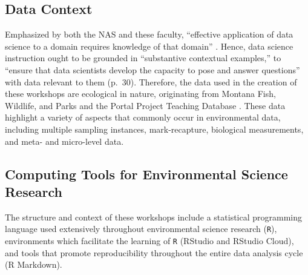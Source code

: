 \documentclass[12pt]{article}
\begin{document}
% 

\subsection{Data Context}  

\quad Emphasized by both the NAS and these faculty, ``effective application of
data science to a domain requires knowledge of that domain'' \citep[p.\ 29]{nas}. 
Hence, data science instruction ought to be grounded in ``substantive contextual
examples,'' to ``ensure that data scientists develop the capacity to pose and
answer questions'' with data relevant to them (p.\ 30). Therefore, the data used
in the creation of these workshops are ecological in nature, originating from
Montana Fish, Wildlife, and Parks and the Portal Project Teaching Database 
\citep{portal_data}. These data highlight a variety of aspects that commonly
occur in environmental data, including multiple sampling instances,
mark-recapture, biological measurements, and meta- and micro-level data. 


\subsection{Computing Tools for Environmental Science Research}  

\quad The structure and context of these workshops include a statistical
programming language used extensively throughout environmental science research
(\texttt{R}), environments which facilitate the learning of \texttt{R}
(RStudio and RStudio Cloud), and tools that promote reproducibility throughout
the entire data analysis cycle (R Markdown).
\end{document}
